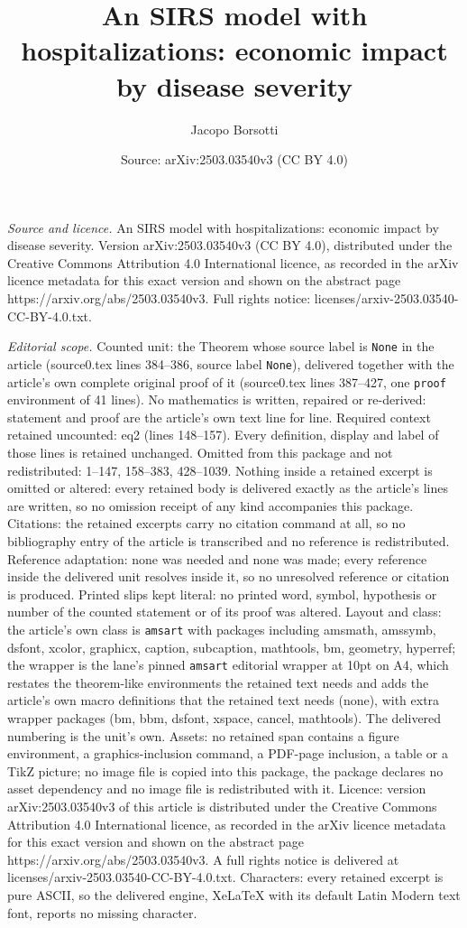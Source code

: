 \documentclass[10pt,a4paper]{amsart}
\title[An SIRS model with hospitalizations: economic impact by dise]{An SIRS model with hospitalizations: economic impact by disease severity}
\author{Jacopo Borsotti}
\date{Source: arXiv:2503.03540v3 (CC BY 4.0)}
\begin{document}
\maketitle

\noindent\emph{Source and licence.} An SIRS model with hospitalizations: economic impact by disease severity. Version arXiv:2503.03540v3 (CC BY 4.0), distributed under the Creative Commons Attribution 4.0 International licence, as recorded in the arXiv licence metadata for this exact version and shown on the abstract page https://arxiv.org/abs/2503.03540v3. Full rights notice: licenses/arxiv-2503.03540-CC-BY-4.0.txt.\par\smallskip

\noindent\textit{Editorial scope.} Counted unit: the Theorem whose source label is \texttt{None} in the article (source0.tex lines 384--386, source label \texttt{None}), delivered together with the article's own complete original proof of it (source0.tex lines 387--427, one \texttt{proof} environment of 41 lines). No mathematics is written, repaired or re-derived: statement and proof are the article's own text line for line. Required context retained uncounted: eq2 (lines 148--157). Every definition, display and label of those lines is retained unchanged. Omitted from this package and not redistributed: 1--147, 158--383, 428--1039. Nothing inside a retained excerpt is omitted or altered: every retained body is delivered exactly as the article's lines are written, so no omission receipt of any kind accompanies this package. Citations: the retained excerpts carry no citation command at all, so no bibliography entry of the article is transcribed and no reference is redistributed. Reference adaptation: none was needed and none was made; every reference inside the delivered unit resolves inside it, so no unresolved reference or citation is produced. Printed slips kept literal: no printed word, symbol, hypothesis or number of the counted statement or of its proof was altered. Layout and class: the article's own class is \texttt{amsart} with packages including amsmath, amssymb, dsfont, xcolor, graphicx, caption, subcaption, mathtools, bm, geometry, hyperref; the wrapper is the lane's pinned \texttt{amsart} editorial wrapper at 10pt on A4, which restates the theorem-like environments the retained text needs and adds the article's own macro definitions that the retained text needs (none), with extra wrapper packages (bm, bbm, dsfont, xspace, cancel, mathtools). The delivered numbering is the unit's own. Assets: no retained span contains a figure environment, a graphics-inclusion command, a PDF-page inclusion, a table or a TikZ picture; no image file is copied into this package, the package declares no asset dependency and no image file is redistributed with it. Licence: version arXiv:2503.03540v3 of this article is distributed under the Creative Commons Attribution 4.0 International licence, as recorded in the arXiv licence metadata for this exact version and shown on the abstract page https://arxiv.org/abs/2503.03540v3. A full rights notice is delivered at licenses/arxiv-2503.03540-CC-BY-4.0.txt. Characters: every retained excerpt is pure ASCII, so the delivered engine, XeLaTeX with its default Latin Modern text font, reports no missing character.
\end{document}

